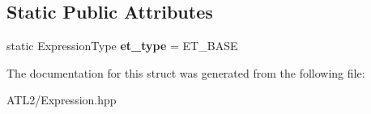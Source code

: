 \subsection*{Static Public Attributes}
\begin{DoxyCompactItemize}
\item 
\hypertarget{structatl_1_1_expression_trait_a93b91ffbf84ec07dcc0084ddddf0a7d3}{static Expression\+Type {\bfseries et\+\_\+type} = E\+T\+\_\+\+B\+A\+S\+E}\label{structatl_1_1_expression_trait_a93b91ffbf84ec07dcc0084ddddf0a7d3}

\end{DoxyCompactItemize}


The documentation for this struct was generated from the following file\+:\begin{DoxyCompactItemize}
\item 
A\+T\+L2/Expression.\+hpp\end{DoxyCompactItemize}
